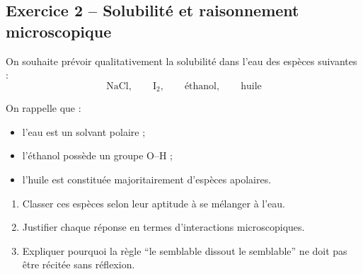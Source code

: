\documentclass[11pt,a4paper]{article}
\begin{document}
\subsection{Exercice 2 -- Solubilité et raisonnement microscopique}

\begin{enoncebox}
On souhaite prévoir qualitativement la solubilité dans l'eau des espèces suivantes :
\[
\mathrm{NaCl},\qquad \mathrm{I_2},\qquad \text{éthanol},\qquad \text{huile}
\]

On rappelle que :
\begin{itemize}
    \item l'eau est un solvant polaire ;
    \item l'éthanol possède un groupe O--H ;
    \item l'huile est constituée majoritairement d'espèces apolaires.
\end{itemize}

\begin{enumerate}[label=\arabic*)]
    \item Classer ces espèces selon leur aptitude à se mélanger à l'eau.
    \item Justifier chaque réponse en termes d'interactions microscopiques.
    \item Expliquer pourquoi la règle ``le semblable dissout le semblable'' ne doit pas être récitée sans réflexion.
\end{enumerate}
\end{enoncebox}
\end{document}

